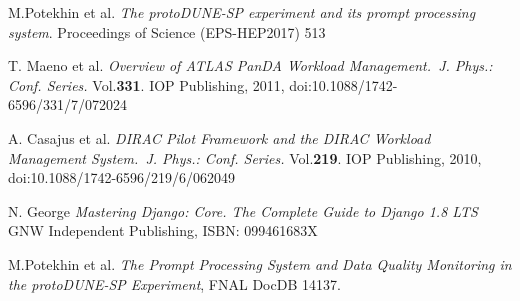 \documentclass[pdftex,12pt,letter]{article}
\begin{document}
%
% 
%
%


\begin{thebibliography}{99}

 M.Potekhin et al. \emph{The protoDUNE-SP experiment and its prompt
processing system}. Proceedings of Science (EPS-HEP2017) 513

T. Maeno et al. \emph{Overview of ATLAS PanDA Workload Management.~J. Phys.: Conf. Series.} Vol.\textbf{331}. IOP Publishing, 2011,
doi:10.1088/1742-6596/331/7/072024


A. Casajus et al.  \emph{DIRAC Pilot Framework and the DIRAC
Workload Management System.~J. Phys.: Conf. Series.} Vol.\textbf{219}. IOP Publishing, 2010,
doi:10.1088/1742-6596/219/6/062049

N. George \emph{Mastering Django: Core. The Complete Guide to Django 1.8 LTS}~ GNW Independent Publishing, ISBN: 099461683X

 M.Potekhin et al.  \emph{The Prompt Processing System and Data Quality Monitoring in the protoDUNE-SP Experiment}, FNAL DocDB 14137.

\end{thebibliography}
\end{document}
